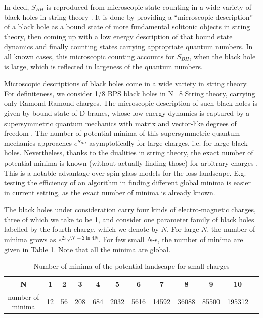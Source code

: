 \documentclass[12pt,a4paper]{JHEP3}
\begin{document}
In deed, $S_{BH}$ is reproduced from microscopic state counting in a wide variety of black holes in string theory \cite{Strominger:1996sh, Maldacena:1997de, Shih:2005qf}. It is done by providing a ``microscopic description'' of a black hole as a bound state of more fundamental solitonic objects in string theory, then coming up with a  low energy description  of that bound state dynamics and finally counting states carrying appropriate quantum numbers. In all known cases, this microscopic counting accounts for $S_{BH}$, when the black hole is large, which is reflected in largeness of the quantum numbers. 

Microscopic descriptions of black holes come in a wide variety in string theory. For definiteness, we consider 1/8 BPS black holes in N=8 String theory, carrying only Ramond-Ramond charges. The microscopic description of such black holes is given by bound state of D-branes, whose low energy dynamics is captured by a supersymmetric quantum mechanics with matrix and vector-like degrees of freedom \cite{Chowdhury:2014yca, Chowdhury:2015gbk}. 
The number of potential minima of this supersymmetric quantum mechanics approaches $e^{S_{BH}}$ asymptotically for large charges, i.e. for large black holes.
 Nevertheless, thanks to the dualities in string theory, the exact number of potential minima is known (without actually finding those) for arbitrary charges \cite{Shih:2005qf, Sen:2009gy}. This is a notable advantage over spin glass models for the loss landscape. E.g. testing the efficiency of an algorithm in finding different global minima is easier in current setting, as the exact number of minima is already known.

The black holes under consideration carry four kinds of electro-magnetic charges, three of which we take to be 1, and consider one parameter family of black holes labelled by the fourth charge, which we denote by $N$. For large $N$, the number of minima grows as $e^{2\pi \sqrt{N} - 2 \ln{} 4N}$. For few small $N$-s, the number of minima are given in Table \ref{indextable}. Note that all the minima are global.
%
%
\begin{table}[htb]
\begin{center}
\begin{tabular}{|c||c|c|c|c|c|c|c|c|c|c|c}
\hline
N & 1 & 2 & 3 & 4 & 5 & 6 & 7 & 8 & 9 & 10\\
\hline
number of minima  & 12 & 56 & 208 & 684 & 2032 & 5616 & 14592 & 36088 & 85500 & 195312\\
\hline
\end{tabular}
\end{center}
\caption{Number of minima of the potential landscape for small charges}\label{indextable}
\end{table}
%
\end{document}
